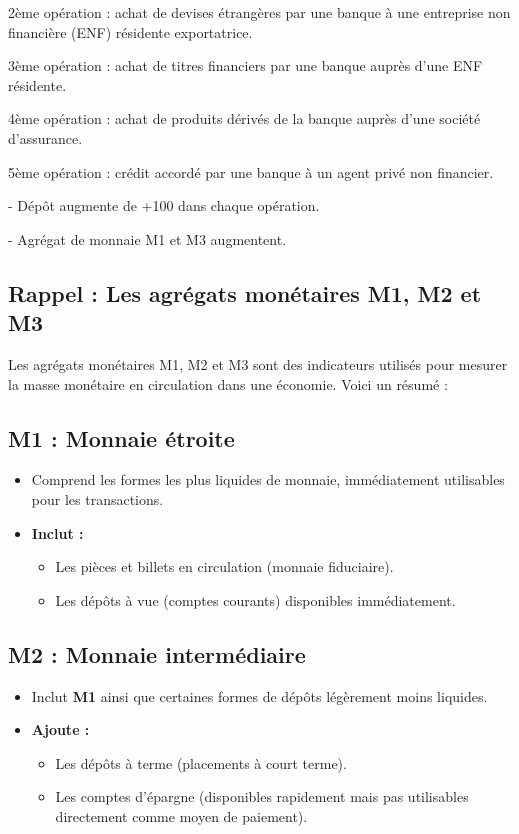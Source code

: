 \documentclass[a4paper, 12pt]{report}
\begin{document}
2ème opération : achat de devises étrangères par une banque à une entreprise non financière (ENF) résidente exportatrice.

3ème opération : achat de titres financiers par une banque auprès d'une ENF résidente.

4ème opération : achat de produits dérivés de la banque auprès d'une société d'assurance.

5ème opération : crédit accordé par une banque à un agent privé non financier.  

- Dépôt augmente de +100 dans chaque opération.  

- Agrégat de monnaie M1 et M3 augmentent.

\subsection*{Rappel : Les agrégats monétaires M1, M2 et M3}

Les agrégats monétaires M1, M2 et M3 sont des indicateurs utilisés pour mesurer la masse monétaire en circulation dans une économie. Voici un résumé :

\subsection*{M1 : Monnaie étroite}
\begin{itemize}
	\item Comprend les formes les plus liquides de monnaie, immédiatement utilisables pour les transactions.
	\item \textbf{Inclut :} 
	\begin{itemize}
		\item Les pièces et billets en circulation (monnaie fiduciaire).
		\item Les dépôts à vue (comptes courants) disponibles immédiatement.
	\end{itemize}
\end{itemize}

\subsection*{M2 : Monnaie intermédiaire}
\begin{itemize}
	\item Inclut \textbf{M1} ainsi que certaines formes de dépôts légèrement moins liquides.
	\item \textbf{Ajoute :}
	\begin{itemize}
		\item Les dépôts à terme (placements à court terme).
		\item Les comptes d'épargne (disponibles rapidement mais pas utilisables directement comme moyen de paiement).
	\end{itemize}
\end{itemize}
\end{document}

